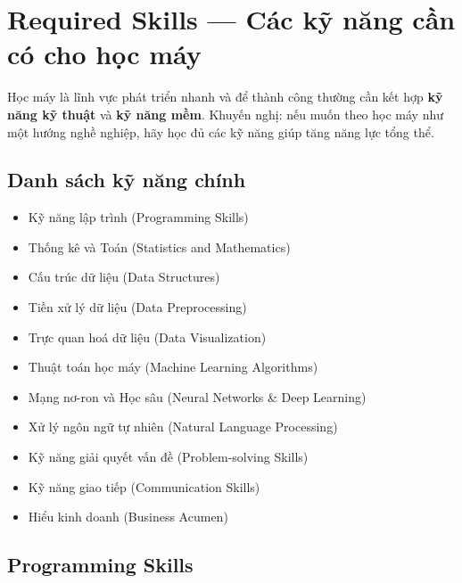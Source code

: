 \section{Required Skills --- Các kỹ năng cần có cho học máy}

\begin{dongco}[title={Tổng quan}]
Học máy là lĩnh vực phát triển nhanh và để thành công thường cần kết hợp \textbf{kỹ năng kỹ thuật} và \textbf{kỹ năng mềm}.
Khuyến nghị: nếu muốn theo học máy như một hướng nghề nghiệp, hãy học đủ các kỹ năng giúp tăng năng lực tổng thể.
\end{dongco}

\subsection{Danh sách kỹ năng chính}

\begin{phuongphap}[title={Key skills}]
\begin{itemize}
  \item Kỹ năng lập trình (Programming Skills)
  \item Thống kê và Toán (Statistics and Mathematics)
  \item Cấu trúc dữ liệu (Data Structures)
  \item Tiền xử lý dữ liệu (Data Preprocessing)
  \item Trực quan hoá dữ liệu (Data Visualization)
  \item Thuật toán học máy (Machine Learning Algorithms)
  \item Mạng nơ-ron và Học sâu (Neural Networks \& Deep Learning)
  \item Xử lý ngôn ngữ tự nhiên (Natural Language Processing)
  \item Kỹ năng giải quyết vấn đề (Problem-solving Skills)
  \item Kỹ năng giao tiếp (Communication Skills)
  \item Hiểu kinh doanh (Business Acumen)
\end{itemize}
\end{phuongphap}

\subsection{Programming Skills}

